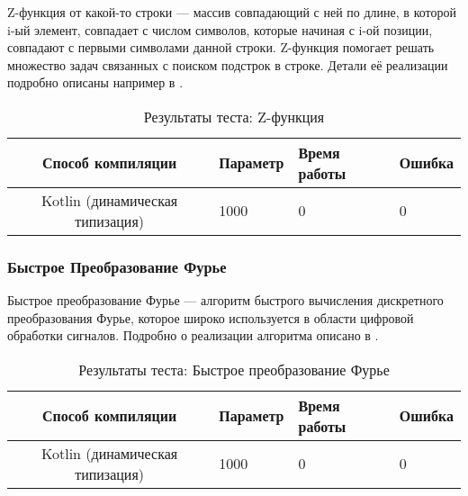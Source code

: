 Z-функция от какой-то строки --- массив совпадающий с ней по длине, в которой i-ый элемент, совпадает с числом символов, которые начиная с i-ой позиции, совпадают с первыми символами данной строки. Z-функция помогает решать множество задач связанных с поиском подстрок в строке.
Детали её реализации подробно описаны например в \cite{algo:gusfield1997algorithms}.

\begin{table}[h]
\caption{\label{tab:zFunctionBenchResults}Результаты теста: Z-функция}
\begin{center}
\begin{tabular}{|c|l|l|l|}
\hline
Способ компиляции & Параметр	& Время работы & Ошибка \\
\hline
Kotlin (динамическая типизация) & 1000 & 0 & 0 \\
\hline
\end{tabular}
\end{center}
\end{table} 

\subsubsection{Быстрое Преобразование Фурье}

Быстрое преобразование Фурье --- алгоритм быстрого вычисления дискретного преобразования Фурье, которое широко используется в области цифровой обработки сигналов. Подробно о реализации алгоритма описано в \cite{algo:dasgypta2014algo}.

\begin{table}[h]
\caption{\label{tab:fftResults}Результаты теста: Быстрое преобразование Фурье}
\begin{center}
\begin{tabular}{|c|l|l|l|}
\hline
Способ компиляции & Параметр	& Время работы & Ошибка \\
\hline
Kotlin (динамическая типизация) & 1000 & 0 & 0 \\
\hline
\end{tabular}
\end{center}
\end{table} 